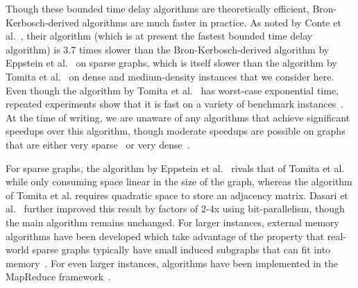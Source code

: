 \documentclass[final,1p]{elsarticle-modified}
\begin{document}
Though these bounded time delay algorithms are theoretically efficient, Bron-Kerbosch-derived algorithms are much faster in practice. As noted by Conte et al.~\cite{conte-2016}, their algorithm (which is at present the fastest bounded time delay algorithm) is 3.7 times slower than the Bron-Kerbosch-derived algorithm by Eppstein et al.~\cite{els-2013} on sparse graphs, which is itself slower than the algorithm by Tomita et al.~\cite{tomita-2006} on dense and medium-density instances that we consider here. Even though the algorithm by Tomita et al.~\cite{tomita-2006} has worst-case exponential time, repeated experiments show that it is fast on a variety of benchmark instances~\cite{tomita-2006,els-2013,cazals-karande-2006,koch2001,naude-2016}. At the time of writing, we are unaware of any algorithms that achieve significant speedups over this algorithm, though moderate speedups are possible on graphs that are either very sparse~\cite{els-2013} or very dense~\cite{naude-2016}.


For sparse graphs, the algorithm by Eppstein et al.~\cite{els-2013} rivals that of Tomita et al.~\cite{tomita-2006} while only consuming space linear in the size of the graph, whereas the algorithm of Tomita et al. requires quadratic space to store an adjacency matrix. Dasari et al.~\cite{dasari-2014} further improved this result by factors of 2-4x using bit-parallelism, though the main algorithm remains unchanged. For larger instances, external memory algorithms have been developed which take advantage of the property that real-world sparse graphs typically have small induced subgraphs that can fit into memory~\cite{cheng-2012}. For even larger instances, algorithms have been implemented in the MapReduce framework~\cite{wu-2009}.

\end{document}
